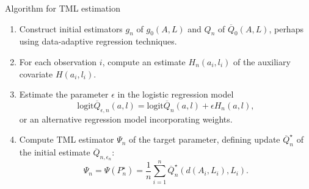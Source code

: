 \documentclass{beamer}
\begin{document}

\begin{frame}[c]{Algorithm for TML estimation}

\begin{center}
\begin{enumerate}\label{tmle_algo}
  \itemsep6pt
  \item Construct initial estimators $g_n$ of $g_0(A, L)$ and $Q_n$ of
    $\overline{Q}_0(A, L)$, perhaps using data-adaptive regression techniques.
  \item For each observation $i$, compute an estimate $H_n(a_i, l_i)$ of the
    auxiliary covariate $H(a_i,l_i)$.
  \item Estimate the parameter $\epsilon$ in the logistic regression model
    $$\text{logit}\overline{Q}_{\epsilon, n}(a, l) =
    \text{logit}\overline{Q}_n(a, l) + \epsilon H_n(a, l),$$
    or an alternative regression model incorporating weights.
  \item Compute TML estimator $\Psi_n$ of the target parameter, defining update
    $\overline{Q}_n^{\star}$ of the initial estimate
    $\overline{Q}_{n, \epsilon_n}$:
    \begin{equation*}\label{tmle}
      \Psi_n = \Psi(P_n^{\star}) = \frac{1}{n} \sum_{i = 1}^n
        \overline{Q}_n^{\star}(d(A_i, L_i), L_i).
      \end{equation*}
\end{enumerate}
\end{center}


\end{frame}

\end{document}
